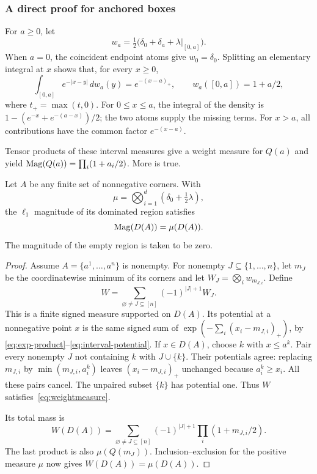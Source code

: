 \subsubsection{A direct proof for anchored boxes}
For $a\ge0$, let
\[
 w_a=\tfrac12\bigl(\delta_0+\delta_a+\lambda|_{[0,a]}\bigr).
\]
When $a=0$, the coincident endpoint atoms give $w_0=\delta_0$.
Splitting an elementary integral at $x$ shows that, for every $x\ge0$,
\begin{equation}
 \int_{[0,a]}e^{-|x-y|}\,dw_a(y)=e^{-(x-a)_+},
 \qquad w_a([0,a])=1+a/2,
 \label{eq:interval-potential}
\end{equation}
where $t_+=\max(t,0)$. For $0\le x\le a$, the integral of the density
is $1-(e^{-x}+e^{-(a-x)})/2$; the two atoms supply the missing terms.
For $x>a$, all contributions have the common factor $e^{-(x-a)}$.

Tensor products of these interval measures give a weight measure for
$Q(a)$ and yield $\operatorname{Mag}(Q(a))=\prod_i(1+a_i/2)$. More is true.

\begin{theorem}
\label{thm:magnitude}
Let $A$ be any finite set of nonnegative corners. With
\[
                  \mu=\bigotimes_{i=1}^d
                         (\delta_0+\tfrac12\lambda),
\]
the $\ell_1$ magnitude of its dominated region satisfies
\begin{equation}
                         \operatorname{Mag}(D(A))=\mu(D(A)).
 \label{eq:mag-product}
\end{equation}
The magnitude of the empty region is taken to be zero.
\end{theorem}
\begin{proof}
Assume $A=\{a^1,\ldots,a^n\}$ is nonempty. For nonempty
$J\subseteq\{1,\ldots,n\}$, let $m_J$ be the coordinatewise minimum
of its corners and let $W_J=\bigotimes_i w_{m_{J,i}}$. Define
\[
             W=\sum_{\varnothing\ne J\subseteq[n]}
                       (-1)^{|J|+1}W_J.
\]
This is a finite signed measure supported on $D(A)$. Its potential at a
nonnegative point $x$ is the same signed sum of
$\exp(-\sum_i(x_i-m_{J,i})_+)$, by
\eqref{eq:exp-product}--\eqref{eq:interval-potential}.
If $x\in D(A)$, choose $k$ with $x\le a^k$. Pair every nonempty
$J$ not containing $k$ with $J\cup\{k\}$. Their potentials agree:
replacing $m_{J,i}$ by $\min(m_{J,i},a_i^k)$ leaves
$(x_i-m_{J,i})_+$ unchanged because $a_i^k\ge x_i$.
All these pairs cancel. The unpaired subset $\{k\}$ has potential one.
Thus $W$ satisfies~\eqref{eq:weightmeasure}.

Its total mass is
\[
 W(D(A))=\sum_{\varnothing\ne J\subseteq[n]}(-1)^{|J|+1}
                      \prod_i(1+m_{J,i}/2).
\]
The last product is also $\mu(Q(m_J))$. Inclusion--exclusion for the
positive measure $\mu$ now gives $W(D(A))=\mu(D(A))$.
\end{proof}

